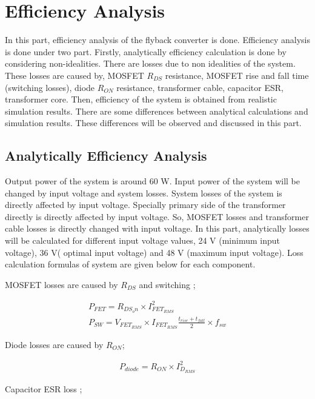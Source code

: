 \section{Efficiency Analysis}

In this part, efficiency analysis of the flyback converter is done. Efficiency analysis is done under two part. Firstly, analytically efficiency calculation is done by considering non-idealities. There are losses due to non idealities of the system. These losses are caused by, MOSFET $R_{DS}$ resistance, MOSFET rise and fall time (switching losses), diode $R_{ON}$ resistance, transformer cable, capacitor ESR, transformer core. Then, efficiency of the system is obtained from realistic simulation results. There are some differences between analytical calculations and simulation results. These differences will be observed and discussed in this part.

\subsection{Analytically Efficiency Analysis}
 
 Output power of the system is around 60 W. Input power of the system will be changed by input voltage and system losses. System losses of the system is directly affected by input voltage. Specially primary side of the transformer directly is directly affected by input voltage. So, MOSFET losses and transformer cable losses is directly changed with input voltage. In this part, analytically losses will be calculated for different input voltage values, 24 V (minimum input voltage), 36 V( optimal input voltage) and 48 V (maximum input voltage). Loss calculation formulas of system are given below for each component.
 
 MOSFET losses are caused by $R_{DS}$ and switching ;
 
 \begin{align}
     P_{FET} = R_{DS_on}\times I_{FET_{RMS}}^2\\
     P_{SW} = V_{FET_{RMS}}\times I_{FET_{RMS}} \frac{t_{rise}+t_{fall}}{2}\times f_{sw} 
 \end{align}
 
 Diode losses are caused by $R_{ON}$; 
 
 \begin{align}
     P_{diode} = R_{ON}\times I_{D_{RMS}}^2
 \end{align}
 
 Capacitor ESR loss ;
 
